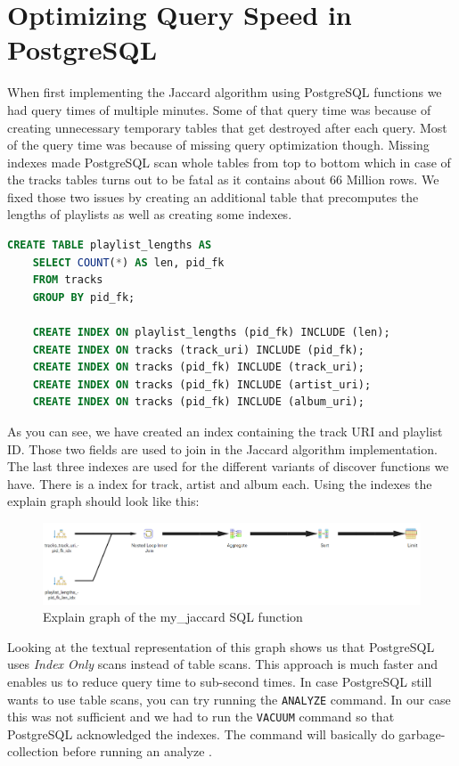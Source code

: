 \section{Optimizing Query Speed in PostgreSQL}

When first implementing the Jaccard algorithm using PostgreSQL functions we had query times of multiple minutes. Some of that query time was because of creating unnecessary temporary tables that get destroyed after each query. Most of the query time was because of missing query optimization though. Missing indexes made PostgreSQL scan whole tables from top to bottom which in case of the tracks tables turns out to be fatal as it contains about 66 Million rows. We fixed those two issues by creating an additional table that precomputes the lengths of playlists as well as creating some indexes.

\begin{lstlisting}[caption={Increasing query performance using a precomputed table and indexes}, style=Base, language=SQL]
    CREATE TABLE playlist_lengths AS
    SELECT COUNT(*) AS len, pid_fk
    FROM tracks
    GROUP BY pid_fk;

    CREATE INDEX ON playlist_lengths (pid_fk) INCLUDE (len);
    CREATE INDEX ON tracks (track_uri) INCLUDE (pid_fk);
    CREATE INDEX ON tracks (pid_fk) INCLUDE (track_uri);
    CREATE INDEX ON tracks (pid_fk) INCLUDE (artist_uri);
    CREATE INDEX ON tracks (pid_fk) INCLUDE (album_uri);
\end{lstlisting}

As you can see, we have created an index containing the track URI and playlist ID. Those two fields are used to join in the Jaccard algorithm implementation. The last three indexes are used for the different variants of discover functions we have. There is a index for track, artist and album each. Using the indexes the explain graph should look like this:

\begin{figure}[bth]
    \centering
    \includegraphics[width=1.0\textwidth]{Graphics/Chapter4/my-jaccard-explain.png}
    \caption{Explain graph of the my{\_}jaccard SQL function}
\end{figure}

Looking at the textual representation of this graph shows us that PostgreSQL uses \textit{Index Only} scans instead of table scans. This approach is much faster and enables us to reduce query time to sub-second times. In case PostgreSQL still wants to use table scans, you can try running the \texttt{ANALYZE} command. In our case this was not sufficient and we had to run the \texttt{VACUUM} command so that PostgreSQL acknowledged the indexes. The command will basically do garbage-collection before running an analyze \cite{PostgresVacuum}.
